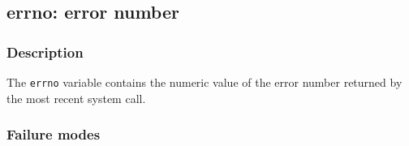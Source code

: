 \clearpage
{}
{}
\label{vars:errno}
\subsection*{errno: error number}

\subsubsection*{Description}

The \verb|errno| variable contains the numeric value of the error
number returned by the most recent system call.

\subsubsection*{Failure modes}



